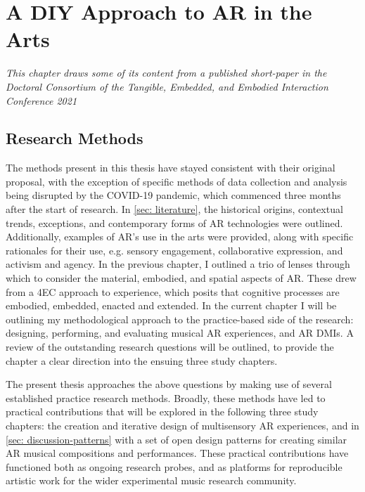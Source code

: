 \chapter{A DIY Approach to AR in the Arts}
\label{sec: method}
\epigraph{\emph{This chapter draws some of its content from a published short-paper in the Doctoral Consortium of the Tangible, Embedded, and Embodied Interaction Conference 2021}}{\cite[]{bilbow2021b}}
\section{Research Methods}\label{sec: method-methods}
The methods present in this thesis have stayed consistent with their original proposal, with the exception of specific methods of data collection and analysis being disrupted by the COVID-19 pandemic, which commenced three months after the start of research. 
In \autoref{sec: literature}, the historical origins, contextual trends, exceptions, and contemporary forms of AR technologies were outlined. Additionally, examples of AR's use in the arts were provided, along with specific rationales for their use, e.g. sensory engagement, collaborative expression, and activism and agency. In the previous chapter, I outlined a trio of lenses through which to consider the material, embodied, and spatial aspects of AR. These drew from a 4EC approach to experience, which posits that cognitive processes are embodied, embedded, enacted and extended. In the current chapter I will be outlining my methodological approach to the practice-based side of the research: designing, performing, and evaluating musical AR experiences, and AR DMIs. A review of the outstanding research questions will be outlined, to provide the chapter a clear direction into the ensuing three study chapters.

\begin{enumerate}
    \RQmedium
    \RQexperience
\end{enumerate}

The present thesis approaches the above questions by making use of several established practice research methods. Broadly, these methods have led to practical contributions that will be explored in the following three study chapters: the creation and iterative design of multisensory AR experiences, and in \autoref{sec: discussion-patterns} with a set of open design patterns for creating similar AR musical compositions and performances. These practical contributions have functioned both as ongoing research probes, and as platforms for reproducible artistic work for the wider experimental music research community. 

